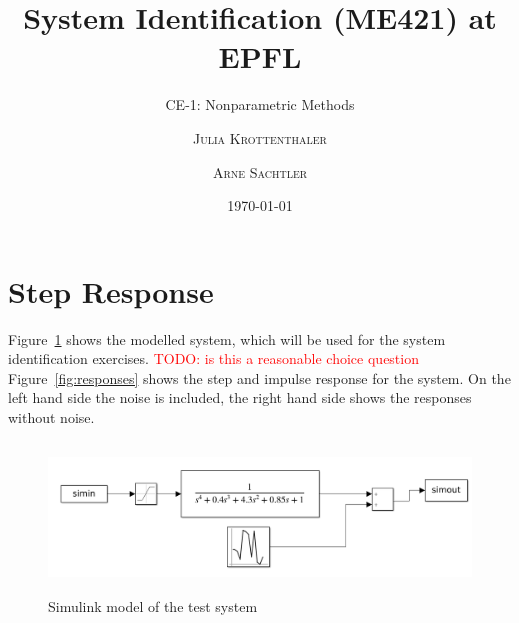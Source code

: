 \documentclass{scrartcl}
\title{System Identification (ME421) at EPFL}
\subtitle{CE-1: Nonparametric Methods}
\author{\textsc{Julia Krottenthaler} \and \textsc{Arne Sachtler}}
\date{\today}
\begin{document}
\maketitle

\section{Step Response}

Figure~\ref{fig:testmodel} shows the modelled system, which will be used for the system identification exercises.
\textcolor{red}{TODO: is this a reasonable choice question}
Figure~\ref{fig:responses} shows the step and impulse response for the system. On the left hand side the noise is included, the right hand side shows the responses without noise.

\begin{figure}[h]
	\centering
	\includegraphics[height=4cm]{figures/systemmodel.png}
	\caption{Simulink model of the test system}\label{fig:testmodel}
\end{figure}
\end{document}
